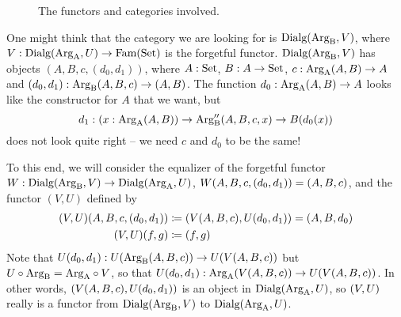 \documentclass[orivec,envcountsame, ,envcountsect]{llncs}
\begin{document}
\begin{figure}
  \centering
  \caption{The functors and categories involved.}
  \label{fig:map-of-functors}
\end{figure}

One might think that the category we are looking for is
$\text{Dialg}(\text{Arg}_{\text{B}}, V)$, where $V :
\text{Dialg}(\text{Arg}_{\text{A}}, U) \to \text{Fam}(\text{Set})$ is the forgetful functor. $\text{Dialg}(\text{Arg}_{\text{B}}, V)$ has
objects $(A, B, c, (d_0, d_1))$, where $A : \text{Set}$, $B : A \to \text{Set}$,
$c : \text{Arg}_{\text{A}}(A, B) \to A$ and $(d_0, d_1) : \text{Arg}_{\text{B}}(A, B, c) \to (A, B)$.
The function $d_0 : \text{Arg}_{\text{A}}(A, B) \to A$ looks like the constructor for
$A$ that we want, but
\[
d_1 : (x : \text{Arg}_{\text{A}}(A, B)) \to \text{Arg}_{\text{B}}''(A, B, c,x) \to B(d_0(x))
\]
does not look quite right -- we need $c$ and $d_0$ to be the same!

To this end, we will consider the equalizer of the forgetful functor
$W : \text{Dialg}(\text{Arg}_{\text{B}}, V) \to
\text{Dialg}(\text{Arg}_{\text{A}}, U)$, $W(A, B, c, (d_0, d_1)) = (A, B, c)$, and the functor $(V, U)$ defined by 
\begin{align*}
  (V, U)(A, B, c, (d_0, d_1))
     &\coloneqq (V(A, B, c), U(d_0, d_1)) = (A, B, d_0) \\
  (V, U)(f, g)
     &\coloneqq (f, g)
\end{align*}
Note that $U(d_0, d_1) : U(\text{Arg}_{\text{B}}(A, B, c)) \to
U(V(A, B, c))$ but $U \circ \text{Arg}_{\text{B}} = \text{Arg}_{\text{A}}
\circ V$, so that $U(d_0, d_1) :
\text{Arg}_{\text{A}}(V(A, B, c)) \to U(V(A, B, c))$. In
other words, $(V(A, B, c), U(d_0, d_1))$ is an
object in $\text{Dialg}(\text{Arg}_{\text{A}}, U)$, so $(V, U)$
really is a functor from $\text{Dialg}(\text{Arg}_{\text{B}}, V)$ to
$\text{Dialg}(\text{Arg}_{\text{A}}, U)$.

\end{document}
